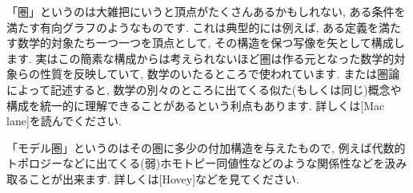 \documentclass[. /main]{subfiles}
\theoremstyle{definition}
\begin{document}


「圏」というのは大雑把にいうと頂点がたくさんあるかもしれない, ある条件を満たす有向グラフのようなものです. これは典型的には例えば, ある定義を満たす数学的対象たち一つ一つを頂点として, その構造を保つ写像を矢として構成します. 実はこの簡素な構成からは考えられないほど圏は作る元となった数学的対象らの性質を反映していて, 数学のいたるところで使われています. または圏論によって記述すると, 数学の別々のところに出てくる似た(もしくは同じ)概念や構成を統一的に理解できることがあるという利点もあります. 詳しくは[Mac lane]を読んでください. 

「モデル圏」というのはその圏に多少の付加構造を与えたもので, 例えば代数的トポロジーなどに出てくる(弱)ホモトピー同値性などのような関係性などを汲み取ることが出来ます. 詳しくは[Hovey]などを見てください. 
\end{document}
